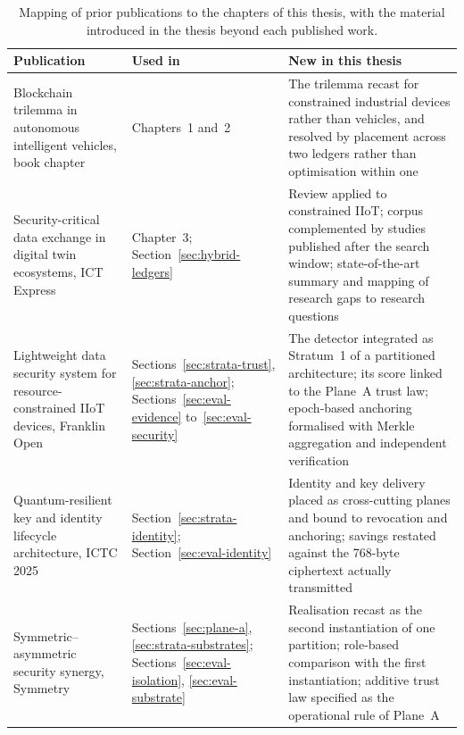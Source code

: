 \begin{titlepage}
\begin{table}[!htbp]
\centering
\footnotesize
\setlength{\tabcolsep}{4pt}
\renewcommand{\arraystretch}{1.3}
\caption{Mapping of prior publications to the chapters of this thesis, with the material introduced in the thesis beyond each published work.}
\label{tab:publication-thesis-mapping}
\begin{tabularx}{\textwidth}{@{}
    >{\raggedright\arraybackslash}p{3.6cm}
    >{\raggedright\arraybackslash}p{2.6cm}
    >{\raggedright\arraybackslash}X@{}}
\toprule
\textbf{Publication} & \textbf{Used in} & \textbf{New in this thesis} \\
\midrule
Blockchain trilemma in autonomous intelligent vehicles, book chapter~\cite{aiv_own}
  & Chapters~1 and~2
  & The trilemma recast for constrained industrial devices rather than vehicles, and resolved by placement across two ledgers rather than optimisation within one \\
\addlinespace
Security-critical data exchange in digital twin ecosystems, ICT Express~\cite{amadi2026security}
  & Chapter~3; Section~\ref{sec:hybrid-ledgers}
  & Review applied to constrained IIoT; corpus complemented by studies published after the search window; state-of-the-art summary and mapping of research gaps to research questions \\
\addlinespace
Lightweight data security system for resource-constrained IIoT devices, Franklin Open~\cite{amadi2026lightweight}
  & Sections~\ref{sec:strata-trust}, \ref{sec:strata-anchor}; Sections~\ref{sec:eval-evidence} to~\ref{sec:eval-security}
  & The detector integrated as Stratum~1 of a partitioned architecture; its score linked to the Plane~A trust law; epoch-based anchoring formalised with Merkle aggregation and independent verification \\
\addlinespace
Quantum-resilient key and identity lifecycle architecture, ICTC 2025~\cite{amadi2025quantum}
  & Section~\ref{sec:strata-identity}; Section~\ref{sec:eval-identity}
  & Identity and key delivery placed as cross-cutting planes and bound to revocation and anchoring; savings restated against the 768-byte ciphertext actually transmitted \\
\addlinespace
Symmetric--asymmetric security synergy, Symmetry~\cite{amadi2026symmetric}
  & Sections~\ref{sec:plane-a}, \ref{sec:strata-substrates}; Sections~\ref{sec:eval-isolation}, \ref{sec:eval-substrate}
  & Realisation recast as the second instantiation of one partition; role-based comparison with the first instantiation; additive trust law specified as the operational rule of Plane~A \\
\bottomrule
\end{tabularx}
\end{table}

\end{titlepage}
